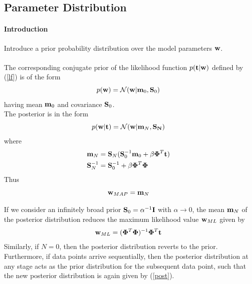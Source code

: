 \documentclass[11pt]{article}
\numberwithin{equation}{section}
\newcommand{\dm}[0]{\mathbf{\Phi}}
\begin{document}
\subsection{Parameter Distribution}
\paragraph{Introduction}
Introduce a prior probability distribution over the model parameters $\textbf{w}$.\\
 \\
The corresponding conjugate prior of the likelihood function $p(\textbf{t}|\textbf{w})$ defined by (\ref{lf}) is of the form
\begin{equation}
	p(\textbf{w}) = \mathcal{N}(\textbf{w}|\textbf{m}_0, \textbf{S}_0)
\end{equation}
having mean $\textbf{m}_0$ and covariance $\textbf{S}_0$.\\
The posterior is in the form
\begin{equation} \label{post}
	p(\textbf{w}|\textbf{t}) = \mathcal{N}(\textbf{w}|\textbf{m}_N, \bf{S}_N)
\end{equation}
where
\begin{align}
	\textbf{m}_N &= \textbf{S}_N(\textbf{S}_0^{-1}\textbf{m}_0 + \beta \mathbf{\Phi}^T\textbf{t})\\
	\textbf{S}_N^{-1} &= \mathbf{S}_0^{-1} + \beta \mathbf{\Phi}^T\mathbf{\Phi}
\end{align}
\remark
{} Thus
$$\textbf{w}_{MAP} = \textbf{m}_{N}$$

\remark
If we consider an infinitely broad prior $\textbf{S}_0 = \alpha^{-1}\textbf{I}$ with $\alpha \rightarrow 0$, the mean $\textbf{m}_N$ of the posterior distribution reduces the maximum likelihood value $\textbf{w}_{ML}$ given by
\begin{equation}
	\vw_{ML} = (\dm^T\dm)^{-1}\dm^T\vt
\end{equation}
\remark
Similarly, if $N = 0$, then the posterior distribution reverts to the prior.
\remark
Furthermore, if data points arrive sequentially, then the posterior distribution at any stage acts as the prior distribution for the subsequent data point, such that the new posterior distribution is again given by (\ref{post}).
\end{document}
